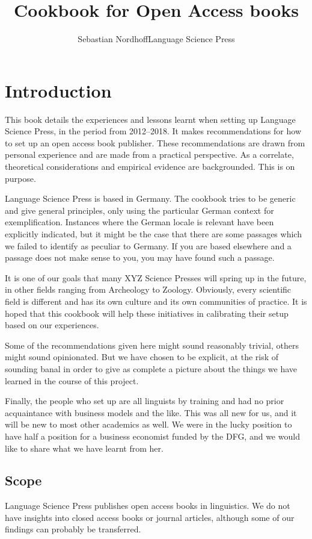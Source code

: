\documentclass[nonflat,modfonts,output=book] {langsci/langscibook}
\title{Cookbook for Open Access books}
\author{Sebastian Nordhoff\newlineCover Language Science Press}
\begin{document}
\maketitle
\frontmatter 
\tableofcontents 
\mainmatter
\chapter{Introduction}
\largerpage
This book details the experiences and lessons learnt when setting up Language Science Press, in the period from 2012--2018. It makes recommendations for how to set up an open access book publisher. These recommendations are drawn from personal experience and are made from a practical perspective. As a correlate, theoretical considerations and empirical evidence are backgrounded. This is on purpose. 

Language Science Press is based in Germany. The cookbook tries to be generic and give general principles, only using the particular German context for exemplification. Instances where the German locale is relevant have been explicitly indicated, but it might be the case that there are some passages which we failed to identify as peculiar to Germany. If you are based elsewhere and a passage does not make sense to you, you may have found such a passage.
 

It is one of our goals that many XYZ Science Presses will spring up in the future, in other fields ranging from Archeology to Zoology. Obviously, every scientific field is different and has its own culture and its own communities of practice. It is hoped that this cookbook will help these initiatives in calibrating their setup based on our experiences. 

Some of the recommendations given here might sound reasonably trivial, others might sound opinionated. But we have chosen to be explicit, at the risk of sounding banal in order to give as complete a picture about the things we have learned in the course of this project.

Finally, the people who set up are all linguists by training and had no prior acquaintance with business models and the like. This was all new for us, and it will be new to most other academics as well. We were in the lucky position to have half a position for a business economist funded by the DFG, and we would like to share what we have learnt from her. 

\section{Scope}
Language Science Press publishes open access books in linguistics. We do not have insights into closed access books or journal articles, although some of our findings can probably be transferred. 
\end{document}
